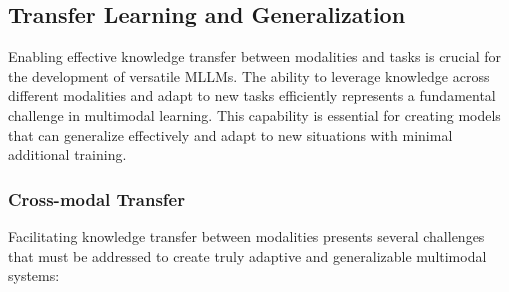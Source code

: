 \subsection{Transfer Learning and Generalization}
Enabling effective knowledge transfer between modalities and tasks is crucial for the development of versatile MLLMs. The ability to leverage knowledge across different modalities and adapt to new tasks efficiently represents a fundamental challenge in multimodal learning. This capability is essential for creating models that can generalize effectively and adapt to new situations with minimal additional training.

\subsubsection{Cross-modal Transfer}
Facilitating knowledge transfer between modalities presents several challenges that must be addressed to create truly adaptive and generalizable multimodal systems:

